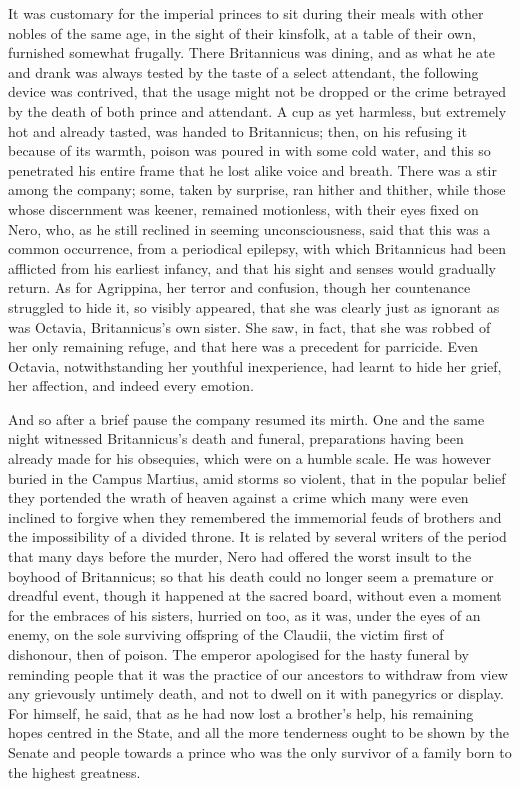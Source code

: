 It was customary for the imperial princes to sit during their meals with other nobles of the same age, in the sight of their kinsfolk, at a table of their own, furnished somewhat frugally. There Britannicus was dining, and as what he ate and drank was always tested by the taste of a select attendant, the following device was contrived, that the usage might not be dropped or the crime betrayed by the death of both prince and attendant. A cup as yet harmless, but extremely hot and already tasted, was handed to Britannicus; then, on his refusing it because of its warmth, poison was poured in with some cold water, and this so penetrated his entire frame that he lost alike voice and breath. There was a stir among the company; some, taken by surprise, ran hither and thither, while those whose discernment was keener, remained motionless, with their eyes fixed on Nero, who, as he still reclined in seeming unconsciousness, said that this was a common occurrence, from a periodical epilepsy, with which Britannicus had been afflicted from his earliest infancy, and that his sight and senses would gradually return. As for Agrippina, her terror and confusion, though her countenance struggled to hide it, so visibly appeared, that she was clearly just as ignorant as was Octavia, Britannicus's own sister. She saw, in fact, that she was robbed of her only remaining refuge, and that here was a precedent for parricide. Even Octavia, notwithstanding her youthful inexperience, had learnt to hide her grief, her affection, and indeed every emotion.


And so after a brief pause the company resumed its mirth. One and the same night witnessed Britannicus's death and funeral, preparations having been already made for his obsequies, which were on a humble scale. He was however buried in the Campus Martius, amid storms so violent, that in the popular belief they portended the wrath of heaven against a crime which many were even inclined to forgive when they remembered the immemorial feuds of brothers and the impossibility of a divided throne. It is related by several writers of the period that many days before the murder, Nero had offered the worst insult to the boyhood of Britannicus; so that his death could no longer seem a premature or dreadful event, though it happened at the sacred board, without even a moment for the embraces of his sisters, hurried on too, as it was, under the eyes of an enemy, on the sole surviving offspring of the Claudii, the victim first of dishonour, then of poison. The emperor apologised for the hasty funeral by reminding people that it was the practice of our ancestors to withdraw from view any grievously untimely death, and not to dwell on it with panegyrics or display. For himself, he said, that as he had now lost a brother's help, his remaining hopes centred in the State, and all the more tenderness ought to be shown by the Senate and people towards a prince who was the only survivor of a family born to the highest greatness.

